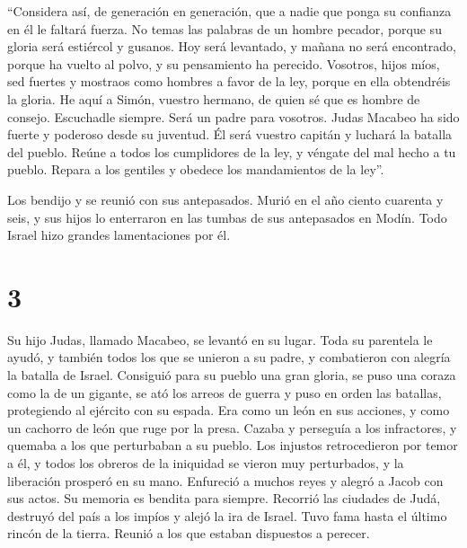  ``Considera así, de generación en generación, que a
nadie que ponga su confianza en él le faltará fuerza.  No
temas las palabras de un hombre pecador, porque su gloria será estiércol
y gusanos.  Hoy será levantado, y mañana no será
encontrado, porque ha vuelto al polvo, y su pensamiento ha perecido.
 Vosotros, hijos míos, sed fuertes y mostraos como
hombres a favor de la ley, porque en ella obtendréis la gloria.
 He aquí a Simón, vuestro hermano, de quien sé que es
hombre de consejo. Escuchadle siempre. Será un padre para vosotros.
 Judas Macabeo ha sido fuerte y poderoso desde su
juventud. Él será vuestro capitán y luchará la batalla del pueblo.
 Reúne a todos los cumplidores de la ley, y véngate del
mal hecho a tu pueblo.  Repara a los gentiles y obedece
los mandamientos de la ley''.

 Los bendijo y se reunió con sus antepasados.
 Murió en el año ciento cuarenta y seis, y sus hijos lo
enterraron en las tumbas de sus antepasados en Modín. Todo Israel hizo
grandes lamentaciones por él.

\hypertarget{section-2}{%
\section{3}\label{section-2}}

 Su hijo Judas, llamado Macabeo, se levantó en su lugar.
 Toda su parentela le ayudó, y también todos los que se
unieron a su padre, y combatieron con alegría la batalla de Israel.
 Consiguió para su pueblo una gran gloria, se puso una
coraza como la de un gigante, se ató los arreos de guerra y puso en
orden las batallas, protegiendo al ejército con su espada.
 Era como un león en sus acciones, y como un cachorro de
león que ruge por la presa.  Cazaba y perseguía a los
infractores, y quemaba a los que perturbaban a su pueblo. 
Los injustos retrocedieron por temor a él, y todos los obreros de la
iniquidad se vieron muy perturbados, y la liberación prosperó en su
mano.  Enfureció a muchos reyes y alegró a Jacob con sus
actos. Su memoria es bendita para siempre.  Recorrió las
ciudades de Judá, destruyó del país a los impíos y alejó la ira de
Israel.  Tuvo fama hasta el último rincón de la tierra.
Reunió a los que estaban dispuestos a perecer.

